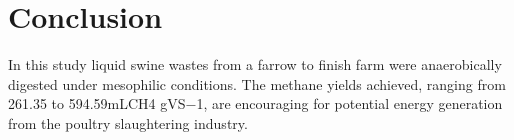 \section{Conclusion}
In this study liquid swine wastes from a farrow to finish farm were anaerobically digested under mesophilic conditions. The methane yields achieved, ranging from 261.35 to 594.59mLCH4 gVS−1, are encouraging for potential energy generation from the poultry slaughtering industry.